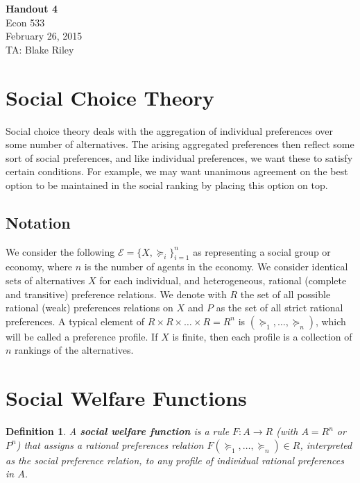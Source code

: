 \documentclass[letter, 10pt]{article}
\theoremstyle{basic}
\newtheorem{definition}{Definition}[section]
\begin{document}
\begin{spacing}{1.0}

\noindent
\textbf{Handout 4} \\
Econ 533 \\
February 26, 2015 \\
TA: Blake Riley \\

\section{Social Choice Theory}

Social choice theory deals with the aggregation of
individual preferences over some number of
alternatives. The arising aggregated preferences then
reflect some sort of social preferences, and like
individual preferences, we want these to satisfy certain
conditions. For example, we may want unanimous agreement
on the best option to be maintained in the social ranking
by placing this option on top.

\subsection{Notation}

We consider the following $\mathcal{E} = \{X,
\succeq_i\}_{i=1}^n$ as representing a social group or
economy, where $n$ is the number of agents in the
economy. We consider identical sets of alternatives $X$
for each individual, and heterogeneous, rational
(complete and transitive) preference relations. We denote
with $R$ the set of all possible rational (weak)
preferences relations on $X$ and $P$ as the set of all
strict rational preferences. A typical element of $R
\times R \times \ldots \times R = R^n$ is $(\succeq_1,
\ldots, \succeq_n)$, which will be called a preference
profile. If $X$ is finite, then each profile is a
collection of $n$ rankings of the alternatives.

\section{Social Welfare Functions}

\begin{definition}
  A \textbf{social welfare function} is a rule $F: A\to
  R$ (with $A= R^n$ or $P^n$) that assigns a rational
  preferences relation $F(\succeq_1, \ldots, \succeq_n)
  \in R$, interpreted as the social preference relation,
  to any profile of individual rational preferences in $A$.
\end{definition}


\end{spacing}
\end{document}
